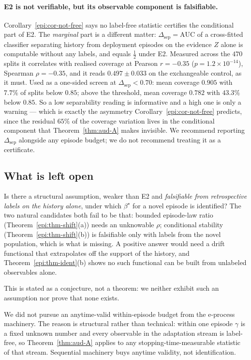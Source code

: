 \paragraph{E2 is not verifiable, but its observable component is falsifiable.}
Corollary~\ref{epi:cor-not-free} says no label-free statistic certifies the conditional part of E2.
The \emph{marginal} part is a different matter: $\Delta_{\mathrm{sep}}=\mathrm{AUC}$ of a
cross-fitted classifier separating history from deployment episodes on the evidence $Z$ alone is
computable without any labels, and equals $\tfrac12$ under E2. Measured across the $470$ splits it
correlates with realised coverage at Pearson $r=-0.35$ ($p=1.2\times10^{-14}$), Spearman
$\rho=-0.35$, and it reads $0.497\pm0.033$ on the exchangeable control, as it must. Used as a
one-sided screen at $\Delta_{\mathrm{sep}}<0.70$: mean coverage $0.905$ with $7.7\%$ of splits below
$0.85$; above the threshold, mean coverage $0.782$ with $43.3\%$ below $0.85$. So a low separability
reading is informative and a high one is only a warning --- which is exactly the asymmetry
Corollary~\ref{epi:cor-not-free} predicts, since the residual $65\%$ of the coverage variation lives
in the conditional component that Theorem~\ref{thm:aud-A} makes invisible. We recommend reporting
$\Delta_{\mathrm{sep}}$ alongside any episode budget; we do not recommend treating it as a
certificate.

\subsection{What is left open}

\begin{conjecture}\label{epi:conj-open}
Is there a structural assumption, weaker than E2 and \emph{falsifiable from retrospective labels on
the history alone}, under which $\beta^\star$ for a novel episode is identified? The two natural
candidates both fail to be that: bounded episode-law ratio (Theorem~\ref{epi:thm-shift}(a)) needs an
unknowable $\rho$; conditional stability (Theorem~\ref{epi:thm-shift}(b)) is falsifiable only with
labels from the novel population, which is what is missing. A positive answer would need a drift
functional that extrapolates off the support of the history, and
Theorem~\ref{epi:thm-ident}(b) shows no such functional can be built from unlabeled observables
alone.
\end{conjecture}

\noindent This is stated as a conjecture, not a theorem: we neither exhibit such an assumption nor
prove that none exists.

We did not pursue an anytime-valid within-episode budget from the e-process machinery. The reason is
structural rather than technical: within one episode $\gamma$ is a fixed unknown number and every
observable in the adaptation stream is label-free, so Theorem~\ref{thm:aud-A} applies to any
stopping-time-measurable statistic of that stream. Sequential machinery buys anytime validity, not
identification.
